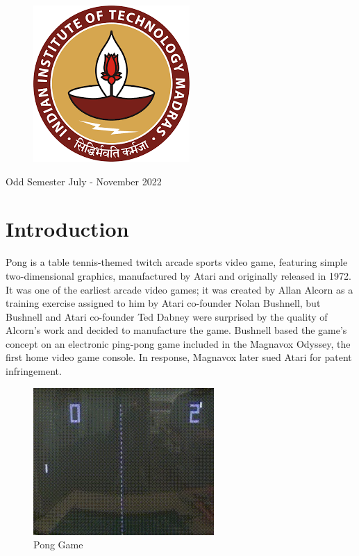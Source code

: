 \documentclass[12pt, a4paper, oneside]{report}
\begin{document}
\begin{titlepage}
\begin{center}
        
    \end{center}
    
    \begin{figure}[h]
        \centerline{\includegraphics[scale=0.6]{logo_iitm.png}}
        
        \label{logo}
    \end{figure}
    
    \begin{center}\large
        {Odd Semester July - November 2022}
    \end{center}
    
    
\end{titlepage}



\newpage

\tableofcontents


\chapter{Introduction}

Pong is a table tennis-themed twitch arcade sports video game, featuring simple two-dimensional graphics, manufactured by Atari and originally released in 1972. It was one of the earliest arcade video games; it was created by Allan Alcorn as a training exercise assigned to him by Atari co-founder Nolan Bushnell, but Bushnell and Atari co-founder Ted Dabney were surprised by the quality of Alcorn's work and decided to manufacture the game. Bushnell based the game's concept on an electronic ping-pong game included in the Magnavox Odyssey, the first home video game console. In response, Magnavox later sued Atari for patent infringement.

\begin{figure}[h]
    \centerline{\includegraphics[scale=0.9]{images/Pong_Game_Test2.jpg}}
    \caption{Pong Game}
    \label{fig:pong}
\end{figure}
\end{document}
